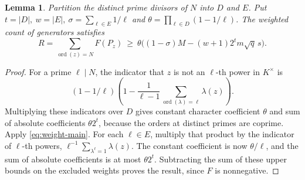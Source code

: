 \documentclass[11pt]{article}
\newtheorem{lemma}[theorem]{Lemma}
\newcommand{\ord}{\operatorname{ord}}
\begin{document}
\begin{lemma}\label{lem:weight-sieve}
Partition the distinct prime divisors of \(N\) into \(D\) and \(E\).
Put \(t=|D|,\ w=|E|,\ \sigma=\sum_{\ell\in E}1/\ell\) and
\(\theta=\prod_{\ell\in D}(1-1/\ell)\). The weighted count of
generators satisfies
\[
 R=\sum_{\ord(z)=N}F(P_z)
 \ \ge\ \theta\big((1-\sigma)M-(w+1)2^t m\sqrt q\,s\big).
\]
\end{lemma}
\begin{proof}
For a prime \(\ell\mid N\), the indicator that \(z\) is not an
\(\ell\)-th power in \(K^\times\) is
\[
 (1-1/\ell)\left(1-\frac{1}{\ell-1}
             \sum_{\ord(\lambda)=\ell}\lambda(z)\right).
\]
Multiplying these indicators over \(D\) gives constant character
coefficient \(\theta\) and sum of absolute coefficients \(\theta2^t\),
because the orders at distinct primes are coprime. Apply
\eqref{eq:weight-main}. For each \(\ell\in E\), multiply that product
by the indicator of \(\ell\)-th powers,
\(\ell^{-1}\sum_{\lambda^\ell=1}\lambda(z)\).
The constant coefficient is now \(\theta/\ell\), and the sum of
absolute coefficients is at most \(\theta2^t\). Subtracting the sum
of these upper bounds on the excluded weights proves the result,
since \(F\) is nonnegative.
\end{proof}
\end{document}
